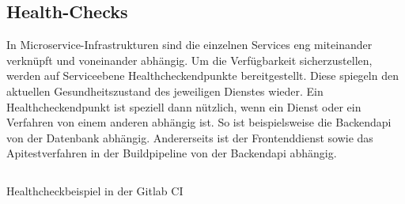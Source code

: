 \subsection{Health-Checks}
\label{subsec:healthcheck}
In Microservice-Infrastrukturen sind die einzelnen Services eng miteinander verknüpft
und voneinander abhängig. Um die Verfügbarkeit sicherzustellen, werden auf
Serviceebene Healthcheckendpunkte bereitgestellt. Diese spiegeln den aktuellen
Gesundheitszustand des jeweiligen Dienstes wieder. Ein Healthcheckendpunkt
ist speziell dann nützlich, wenn ein Dienst oder ein Verfahren von einem anderen
abhängig ist. So ist beispielsweise die Backendapi von der Datenbank
abhängig. Andererseits ist der Frontenddienst sowie das Apitestverfahren
in der Buildpipeline von der Backendapi abhängig. 

\begin{listing}
    \label{lst:healthcheck}
    \inputminted{sh}{snippets/sh/healthcheck.sh}
    \caption{Healthcheckbeispiel in der Gitlab CI}
\end{listing}

